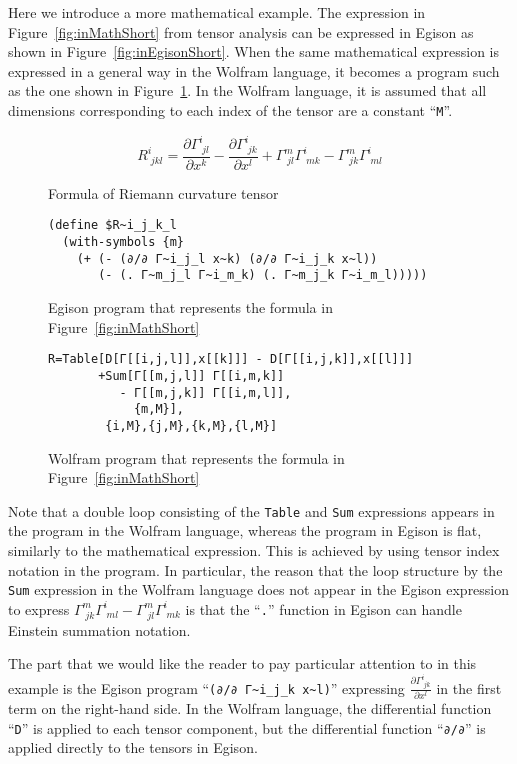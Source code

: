 \documentclass[acmlarge]{acmart}
\begin{document}
Here we introduce a more mathematical example.
The expression in Figure~\ref{fig:inMathShort} from tensor analysis can be expressed in Egison as shown in Figure~\ref{fig:inEgisonShort}.
When the same mathematical expression is expressed in a general way in the Wolfram language, it becomes a program such as the one shown in Figure~\ref{fig:inWolframShort}.
In the Wolfram language, it is assumed that all dimensions corresponding to each index of the tensor are a constant ``\texttt{M}''.

\begin{figure}[t]
\[R^{i}_{\;jkl} = \frac{\partial \Gamma^{i}_{\;jl}}{\partial x^k} - \frac{\partial \Gamma^{i}_{\;jk}}{\partial x^l} + \Gamma^{m}_{\;jl} \Gamma^{i}_{\;mk} - \Gamma^{m}_{\;jk} \Gamma^{i}_{\;ml} \]
  \caption{Formula of Riemann curvature tensor}
  \label{fig:inMathShort}
  \medskip
{\footnotesize
\begin{verbatim}
(define $R~i_j_k_l
  (with-symbols {m}
    (+ (- (∂/∂ Γ~i_j_l x~k) (∂/∂ Γ~i_j_k x~l))
       (- (. Γ~m_j_l Γ~i_m_k) (. Γ~m_j_k Γ~i_m_l)))))
\end{verbatim}
}
  \caption{Egison program that represents the formula in Figure~\ref{fig:inMathShort}}
  \label{fig:inEgisonShort}
  \medskip
{\footnotesize
\begin{verbatim}
R=Table[D[Γ[[i,j,l]],x[[k]]] - D[Γ[[i,j,k]],x[[l]]]
       +Sum[Γ[[m,j,l]] Γ[[i,m,k]]
          - Γ[[m,j,k]] Γ[[i,m,l]],
            {m,M}],
        {i,M},{j,M},{k,M},{l,M}]
\end{verbatim}
}
  \caption{Wolfram program that represents the formula in Figure~\ref{fig:inMathShort}}
  \label{fig:inWolframShort}
\end{figure}

Note that a double loop consisting of the \texttt{Table} and \texttt{Sum} expressions appears in the program in the Wolfram language, whereas the program in Egison is flat, similarly to the mathematical expression.
This is achieved by using tensor index notation in the program.
In particular, the reason that the loop structure by the \texttt{Sum} expression in the Wolfram language does not appear in the Egison expression to express $\Gamma^{m}_{\;jk} \Gamma^{i}_{\;ml} - \Gamma^{m}_{\;jl} \Gamma^{i}_{\;mk}$ is that the ``\texttt{.}'' function in Egison can handle Einstein summation notation.

The part that we would like the reader to pay particular attention to in this example is the Egison program ``\verb|(∂/∂ Γ~i_j_k x~l)|'' expressing $\frac{\partial \Gamma^{i}_{\;jk}}{\partial x^l}$ in the first term on the right-hand side.
In the Wolfram language, the differential function ``\texttt{D}'' is applied to each tensor component, but the differential function ``\texttt{∂/∂}'' is applied directly to the tensors in Egison.
\end{document}
